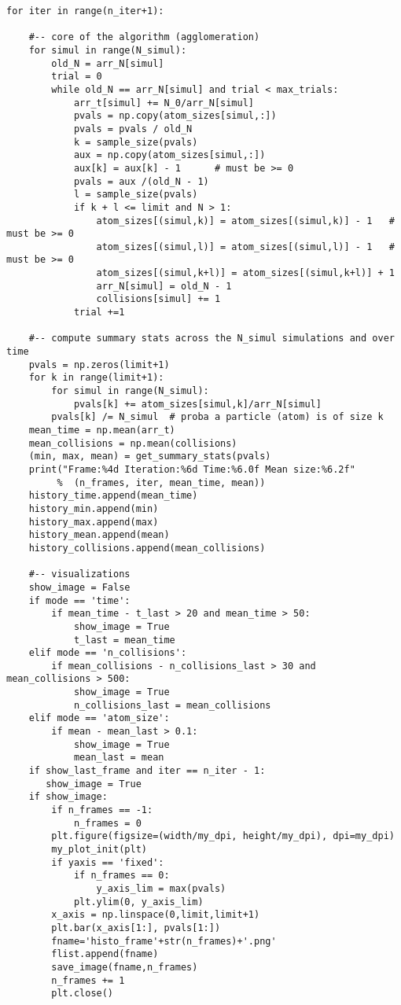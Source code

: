 \documentclass[oneside,10pt]{book}
\begin{document}
\begin{lstlisting}
for iter in range(n_iter+1):

    #-- core of the algorithm (agglomeration)
    for simul in range(N_simul):
        old_N = arr_N[simul]
        trial = 0
        while old_N == arr_N[simul] and trial < max_trials:  
            arr_t[simul] += N_0/arr_N[simul]
            pvals = np.copy(atom_sizes[simul,:])
            pvals = pvals / old_N 
            k = sample_size(pvals)
            aux = np.copy(atom_sizes[simul,:])
            aux[k] = aux[k] - 1      # must be >= 0
            pvals = aux /(old_N - 1)
            l = sample_size(pvals)
            if k + l <= limit and N > 1:
                atom_sizes[(simul,k)] = atom_sizes[(simul,k)] - 1   # must be >= 0
                atom_sizes[(simul,l)] = atom_sizes[(simul,l)] - 1   # must be >= 0
                atom_sizes[(simul,k+l)] = atom_sizes[(simul,k+l)] + 1
                arr_N[simul] = old_N - 1
                collisions[simul] += 1
            trial +=1 

    #-- compute summary stats across the N_simul simulations and over time        
    pvals = np.zeros(limit+1)
    for k in range(limit+1):
        for simul in range(N_simul):
            pvals[k] += atom_sizes[simul,k]/arr_N[simul]
        pvals[k] /= N_simul  # proba a particle (atom) is of size k
    mean_time = np.mean(arr_t)
    mean_collisions = np.mean(collisions)
    (min, max, mean) = get_summary_stats(pvals)  
    print("Frame:%4d Iteration:%6d Time:%6.0f Mean size:%6.2f" 
         %  (n_frames, iter, mean_time, mean))
    history_time.append(mean_time)
    history_min.append(min)
    history_max.append(max)
    history_mean.append(mean)
    history_collisions.append(mean_collisions) 

    #-- visualizations 
    show_image = False
    if mode == 'time':
        if mean_time - t_last > 20 and mean_time > 50:
            show_image = True
            t_last = mean_time
    elif mode == 'n_collisions':
        if mean_collisions - n_collisions_last > 30 and mean_collisions > 500:  
            show_image = True
            n_collisions_last = mean_collisions
    elif mode == 'atom_size':
        if mean - mean_last > 0.1: 
            show_image = True
            mean_last = mean
    if show_last_frame and iter == n_iter - 1:
       show_image = True   
    if show_image:
        if n_frames == -1:
            n_frames = 0
        plt.figure(figsize=(width/my_dpi, height/my_dpi), dpi=my_dpi)
        my_plot_init(plt)
        if yaxis == 'fixed':
            if n_frames == 0:
                y_axis_lim = max(pvals)
            plt.ylim(0, y_axis_lim)
        x_axis = np.linspace(0,limit,limit+1)
        plt.bar(x_axis[1:], pvals[1:])
        fname='histo_frame'+str(n_frames)+'.png'
        flist.append(fname)
        save_image(fname,n_frames)
        n_frames += 1 
        plt.close()
    

\end{lstlisting}
\end{document}
